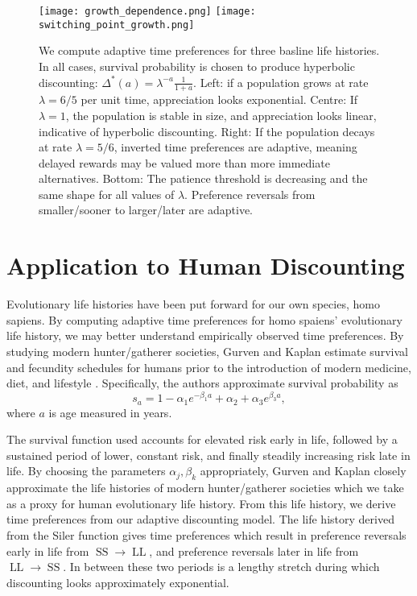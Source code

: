 \documentclass[titlepage, hidelinks, 12pt]{article}
\theoremstyle{plain}
\theoremstyle{remark}
\theoremstyle{definition}
\DeclareMathOperator{\smallersooner}{SS}
\DeclareMathOperator{\largerlater}{LL}
\begin{document}
\begin{figure}[H]
    \centering
    \texttt{[image: growth\_dependence.png]}
    \texttt{[image: switching\_point\_growth.png]}
    \caption[Appreciation and preference plots for different demographic trends.]{We compute adaptive time preferences for three basline life histories. In all cases, survival probability is chosen to 
        produce hyperbolic discounting: $\Delta^*(a) = \lambda^{-a}\frac{1}{1+a}$. 
        Left: if a population grows at rate $\lambda = 6/5$ per unit time, appreciation looks exponential.
        Centre: If $\lambda = 1$, the population is stable in size, and appreciation looks linear, indicative of hyperbolic discounting. Right:
        If the population decays at rate $\lambda = 5/6$, inverted time preferences are adaptive, meaning delayed rewards may be valued more than
        more immediate alternatives. Bottom: The patience threshold is decreasing and the same shape for all values of $\lambda$. Preference reversals
    from smaller/sooner to larger/later are adaptive.}
\end{figure}
\newpage


\section{Application to Human Discounting}
Evolutionary life histories have been put forward for our own species, homo sapiens. By computing adaptive time preferences for homo spaiens' 
evolutionary life history, we may better understand empirically observed time preferences. By studying modern hunter/gatherer societies, Gurven and Kaplan 
estimate survival and fecundity schedules for humans prior to the introduction of modern medicine, diet, and lifestyle \cite{gurven07}. Specifically,
the authors approximate survival probability as 
\begin{equation}
    s_a = 1 - \alpha_1 e^{-\beta_1 a} + \alpha_2 + \alpha_3 e^{\beta_3 a}, 
    \label{eqn:siler}
\end{equation}
where $a$ is age measured in years. 

The survival function used accounts for elevated risk early in life, followed by a sustained
period of lower, constant risk, and finally steadily increasing risk late in life. By choosing the parameters $\alpha_j, \beta_k$ appropriately,
Gurven and Kaplan closely approximate the life histories of modern hunter/gatherer societies which we take as a proxy for human
evolutionary life history. From this life history, we derive time preferences from our adaptive discounting model. The life history 
derived from the Siler function gives time preferences which 
result in preference reversals early in life from $\smallersooner\to\largerlater$, and preference reversals later in life 
from $\largerlater\to\smallersooner$.
In between these two periods is a lengthy stretch during which discounting looks approximately exponential. 
\end{document}
